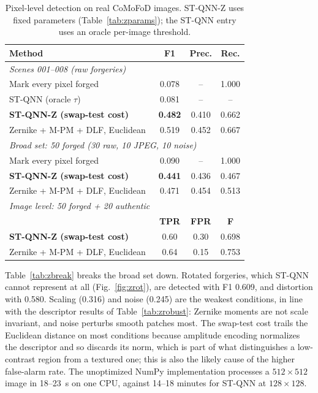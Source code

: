 \documentclass[conference]{IEEEtran}
\begin{document}
\begin{table}[t]
\centering
\caption{Pixel-level detection on real CoMoFoD images. ST-QNN-Z uses fixed parameters (Table~\ref{tab:zparams}); the ST-QNN entry uses an oracle per-image threshold.}
\label{tab:zdetect}
\setlength{\tabcolsep}{3pt}
\begin{tabular}{lccc}
\toprule
\textbf{Method} & \textbf{F1} & \textbf{Prec.} & \textbf{Rec.}\\
\midrule
\multicolumn{4}{l}{\emph{Scenes 001--008 (raw forgeries)}}\\
Mark every pixel forged & 0.078 & -- & 1.000\\
ST-QNN (oracle $\tau$) & 0.081 & -- & --\\
\textbf{ST-QNN-Z (swap-test cost)} & \textbf{0.482} & 0.410 & 0.662\\
Zernike + M-PM + DLF, Euclidean~\cite{cozzolino2015} & 0.519 & 0.452 & 0.667\\
\midrule
\multicolumn{4}{l}{\emph{Broad set: 50 forged (30 raw, 10 JPEG, 10 noise)}}\\
Mark every pixel forged & 0.090 & -- & 1.000\\
\textbf{ST-QNN-Z (swap-test cost)} & \textbf{0.441} & 0.436 & 0.467\\
Zernike + M-PM + DLF, Euclidean & 0.471 & 0.454 & 0.513\\
\midrule
\multicolumn{4}{l}{\emph{Image level: 50 forged + 20 authentic}}\\
 & \textbf{TPR} & \textbf{FPR} & \textbf{F}\\
\textbf{ST-QNN-Z (swap-test cost)} & 0.60 & 0.30 & 0.698\\
Zernike + M-PM + DLF, Euclidean & 0.64 & 0.15 & 0.753\\
\bottomrule
\end{tabular}
\end{table}

Table~\ref{tab:zbreak} breaks the broad set down. Rotated forgeries, which ST-QNN cannot represent at all (Fig.~\ref{fig:zrot}), are detected with F1 0.609, and distortion with 0.580. Scaling (0.316) and noise (0.245) are the weakest conditions, in line with the descriptor results of Table~\ref{tab:zrobust}: Zernike moments are not scale invariant, and noise perturbs smooth patches most. The swap-test cost trails the Euclidean distance on most conditions because amplitude encoding normalizes the descriptor and so discards its norm, which is part of what distinguishes a low-contrast region from a textured one; this is also the likely cause of the higher false-alarm rate. The unoptimized NumPy implementation processes a $512\times512$ image in 18--23~s on one CPU, against 14--18 minutes for ST-QNN at $128\times128$.
\end{document}
